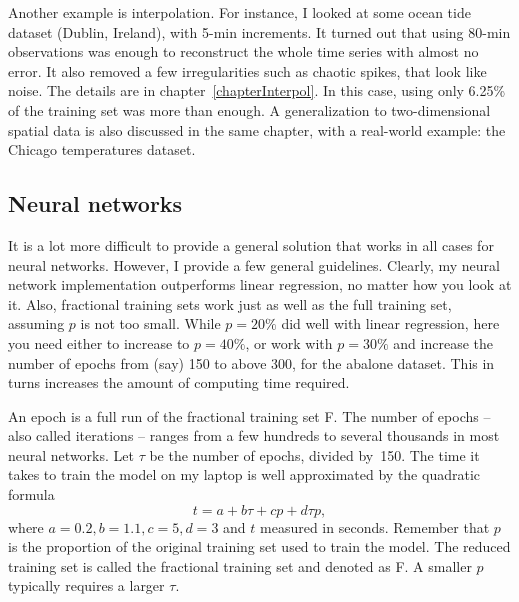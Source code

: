 \documentclass[oneside,10pt]{book}
\begin{document}
Another example is interpolation. For instance, I looked at some ocean tide dataset (Dublin, Ireland), with 5-min increments. It turned out that using 80-min observations was enough to reconstruct the whole time series with almost no error. It also removed a few irregularities such as chaotic spikes, that look like noise. The details are in chapter~\ref{chapterInterpol}. In this case, using only 6.25\% of the training set was more than enough. A generalization to two-dimensional spatial data is also discussed in the same chapter, with a real-world example:  the Chicago temperatures dataset.

\subsection{Neural networks}\label{nnflatulence}

It is a lot more difficult to provide a general solution that works in all cases for neural networks. However, I provide a few general guidelines.
 Clearly, my neural network implementation outperforms linear regression, no matter how you look at it. Also, fractional training sets
 work just as well as the full training set, assuming $p$ is not too small. While $p=20\%$ did well with linear regression, here you need either to increase to $p=40\%$, or work with $p=30\%$ and increase the number of \textcolor{index}{epochs} from (say) 150 to above 300, for the abalone dataset. This in turns increases the amount of computing time required.

An epoch is a full run of the fractional training set F. The number of epochs -- also called iterations -- ranges from a few hundreds to several thousands in most neural networks. Let $\tau$ be the number of epochs, divided by~150. The time it takes to train the model on my laptop is well approximated by the quadratic formula
$$t = a + b \tau + c  p + d  \tau p,$$
where $a=0.2, b = 1.1, c = 5, d = 3$
and  $t$ measured in seconds. Remember that $p$ is the proportion of the original training set used to train the model. 
 The reduced training set is called the fractional training set and denoted as F. A smaller $p$ typically requires a larger $\tau$. 
\end{document}
